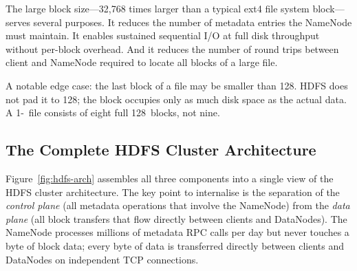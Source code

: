 The large block size---32,768 times larger than a typical ext4 file
system block---serves several purposes. It reduces the number of
metadata entries the NameNode must maintain. It enables sustained
sequential I/O at full disk throughput without per-block overhead. And
it reduces the number of round trips between client and NameNode
required to locate all blocks of a large file.

A notable edge case: the last block of a file may be smaller than
128\MB. HDFS does not pad it to 128\MB; the block occupies only as
much disk space as the actual data. A 1-\GB\ file consists of eight
full 128\MB\ blocks, not nine.

\subsection*{The Complete HDFS Cluster Architecture}
\label{subsec:hdfs-arch-overview}

Figure~\ref{fig:hdfs-arch} assembles all three components into a single
view of the HDFS cluster architecture. The key point to internalise is
the separation of the \emph{control plane} (all metadata operations that
involve the NameNode) from the \emph{data plane} (all block transfers
that flow directly between clients and DataNodes). The NameNode processes
millions of metadata RPC calls per day but never touches a byte of block
data; every byte of data is transferred directly between clients and
DataNodes on independent TCP connections.

